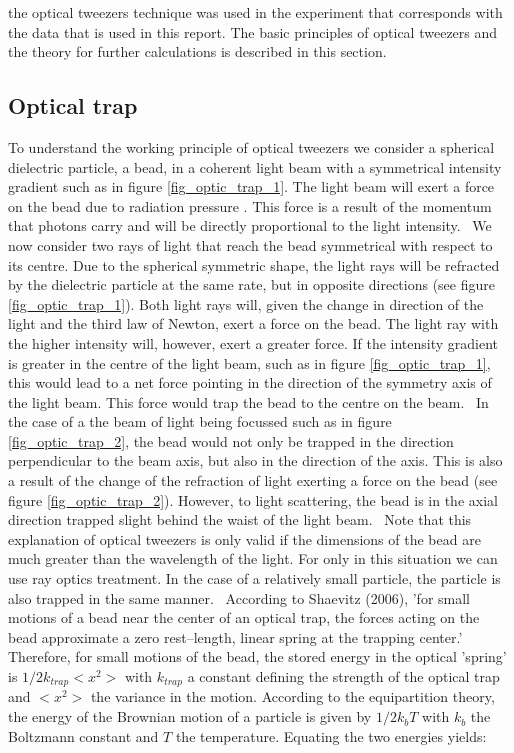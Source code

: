 
 the optical tweezers technique was used in the experiment that corresponds with the data that is used in this report. The basic principles of optical tweezers and the theory for further calculations is described in this section.
 
 
\subsection*{Optical trap}

To understand the working principle of optical tweezers we consider a spherical dielectric particle, a bead, in a coherent light beam with a symmetrical intensity gradient such as in figure \ref{fig_optic_trap_1}. The light beam will exert a force on the bead due to radiation pressure \cite{ashkin}. This force is a result of the momentum that photons carry and will be directly proportional to the light intensity. \
We now consider two rays of light that reach the bead symmetrical with respect to its centre. Due to the spherical symmetric shape, the light rays will be refracted by the dielectric particle at the same rate, but in opposite directions (see figure \ref{fig_optic_trap_1}). Both light rays will, given the change in direction of the light and the third law of Newton, exert a force on the bead. The light ray with the higher intensity will, however, exert a greater force. If the intensity gradient is greater in the centre of the light beam, such as in figure \ref{fig_optic_trap_1}, this would lead to a net force pointing in the direction of the symmetry axis of the light beam. This force would trap the bead to the centre on the beam. \
In the case of a the beam of light being focussed such as in figure \ref{fig_optic_trap_2}, the bead would not only be trapped in the direction perpendicular to the beam axis, but also in the direction of the axis. This is also a result of the change of the refraction of light exerting a force on the bead (see figure \ref{fig_optic_trap_2}). However, to light scattering, the bead is in the axial direction trapped slight behind the waist of the light beam.\cite{Sheavitz} \
Note that this explanation of optical tweezers is only valid if the dimensions of the bead are much greater than the wavelength of the light. For only in this situation we can use ray optics treatment. In the case of a relatively small particle, the particle is also trapped in the same manner.  \
According to Shaevitz (2006), 'for small motions of a bead near the center of an optical trap, the forces acting on the bead approximate a zero rest–length, linear spring at the trapping center.' Therefore, for small motions of the bead, the stored energy in the optical 'spring' is $1/2 k_{trap} <x^2>$ with $k_{trap}$ a constant defining the strength of the optical trap and $<x^2>$ the variance in the motion. According to the equipartition theory, the energy of the Brownian motion of a particle is given by $1/2 k_b T$ with $k_b$ the Boltzmann constant and $T$ the temperature.\cite{Shaevitz} Equating the two energies yields:

